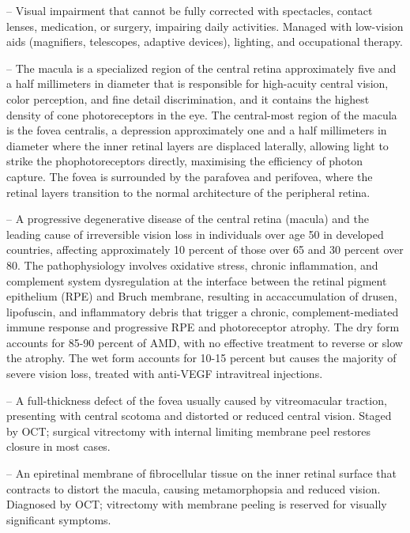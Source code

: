 -- Visual impairment that cannot be fully corrected with spectacles, contact lenses, medication, or surgery, impairing daily activities. Managed with low-vision aids (magnifiers, telescopes, adaptive devices), lighting, and occupational therapy.

-- The macula is a specialized region of the central retina approximately five and a half millimeters in diameter that is responsible for high-acuity central vision, color perception, and fine detail discrimination, and it contains the highest density of cone photoreceptors in the eye. The central-most region of the macula is the fovea centralis, a depression approximately one and a half millimeters in diameter where the inner retinal layers are displaced laterally, allowing light to strike the phophotoreceptors directly, maximising the efficiency of photon capture. The fovea is surrounded by the parafovea and perifovea, where the retinal layers transition to the normal architecture of the peripheral retina.

-- A progressive degenerative disease of the central retina (macula) and the leading cause of irreversible vision loss in individuals over age 50 in developed countries, affecting approximately 10 percent of those over 65 and 30 percent over 80. The pathophysiology involves oxidative stress, chronic inflammation, and complement system dysregulation at the interface between the retinal pigment epithelium (RPE) and Bruch membrane, resulting in accaccumulation of drusen, lipofuscin, and inflammatory debris that trigger a chronic, complement-mediated immune response and progressive RPE and photoreceptor atrophy. The dry form accounts for 85-90 percent of AMD, with no effective treatment to reverse or slow the atrophy. The wet form accounts for 10-15 percent but causes the majority of severe vision loss, treated with anti-VEGF intravitreal injections.

-- A full-thickness defect of the fovea usually caused by vitreomacular traction, presenting with central scotoma and distorted or reduced central vision. Staged by OCT; surgical vitrectomy with internal limiting membrane peel restores closure in most cases.

-- An epiretinal membrane of fibrocellular tissue on the inner retinal surface that contracts to distort the macula, causing metamorphopsia and reduced vision. Diagnosed by OCT; vitrectomy with membrane peeling is reserved for visually significant symptoms.

